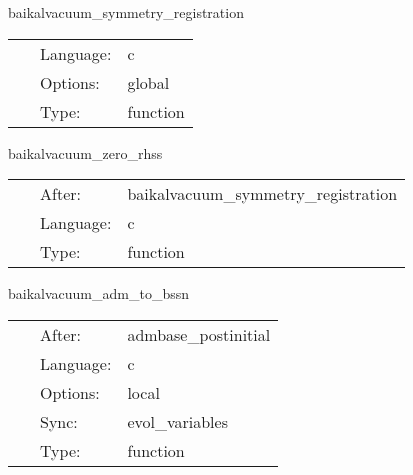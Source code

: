 \vspace{5mm}


\hspace{5mm} baikalvacuum\_symmetry\_registration 

\hspace{5mm}{\it register symmetries, the cartgrid3d way. } 


\hspace{5mm}

 \begin{tabular*}{160mm}{cll} 
~ & Language:  & c \\ 
~ & Options:  & global \\ 
~ & Type:  & function \\ 
\end{tabular*} 


\vspace{5mm}


\hspace{5mm} baikalvacuum\_zero\_rhss 

\hspace{5mm}{\it idea from lean: set all rhs functions to zero to prevent spurious nans } 


\hspace{5mm}

 \begin{tabular*}{160mm}{cll} 
~ & After:  & baikalvacuum\_symmetry\_registration \\ 
~ & Language:  & c \\ 
~ & Type:  & function \\ 
\end{tabular*} 


\vspace{5mm}


\hspace{5mm} baikalvacuum\_adm\_to\_bssn 

\hspace{5mm}{\it convert initial data into bssn variables } 


\hspace{5mm}

 \begin{tabular*}{160mm}{cll} 
~ & After:  & admbase\_postinitial \\ 
~ & Language:  & c \\ 
~ & Options:  & local \\ 
~ & Sync:  & evol\_variables \\ 
~ & Type:  & function \\ 
\end{tabular*} 



